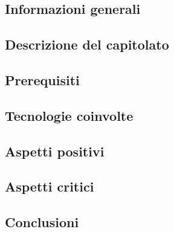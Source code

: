 \subsection{Informazioni generali}


\subsection{Descrizione del capitolato}


\subsection{Prerequisiti}


\subsection{Tecnologie coinvolte}


\subsection{Aspetti positivi}


\subsection{Aspetti critici}


\subsection{Conclusioni}

